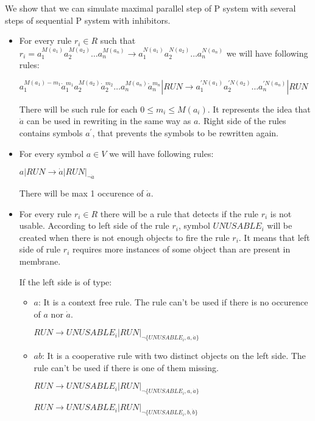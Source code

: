 \documentclass[a4paper,10pt]{article}
\begin{document}
\begin{dokaz}
  We show that we can simulate maximal parallel step of P system with several steps of sequential P system with inhibitors.

  \begin{itemize}
    \item For every rule $r_i\in R$ such that $r_i = a_1^{M(a_1)}a_2^{M(a_2)}\dots a_n^{M(a_n)} \rightarrow a_1^{N(a_1)}a_2^{N(a_2)}\dots a_n^{N(a_n)}$ we will have following rules:
  
    $a_1^{M(a_1)-m_1}\dot{a}_1^{m_1}a_2^{M(a_2)}\dot{a}_2^{m_2}\dots a_n^{M(a_n)}\dot{a}_n^{m_n}|RUN \rightarrow a_1^{\prime N(a_1)}a_2^{\prime N(a_2)}\dots a_n^{\prime N(a_n)}|RUN$

    There will be such rule for each $0\leq m_i\leq M(a_i)$. It represents the idea that $\dot{a}$ can be used in rewriting in the same way as $a$. Right side of the rules contains symbols $a^\prime$, that prevents the symbols to be rewritten again.

    \item For every symbol $a\in V$ we will have following rules:

    $a|RUN \rightarrow \dot{a}|RUN|_{\neg \dot{a}}$

    There will be max 1 occurence of $\dot{a}$.

    \item For every rule $r_i\in R$ there will be a rule that detects if the rule $r_i$ is not usable. According to left side of the rule $r_i$, symbol $UNUSABLE_i$ will be created when there is not enough objects to fire the rule $r_i$. It means that left side of rule $r_i$ requires more instances of some object than are present in membrane.

    If the left side is of type:
    \begin{itemize}
      \item $a$: It is a context free rule. The rule can't be used if there is no occurence of $a$ nor $\dot{a}$.

      $RUN \rightarrow UNUSABLE_i|RUN|_{\neg\{UNUSABLE_i, a, \dot{a}\}}$

      \item $ab$: It is a cooperative rule with two distinct objects on the left side. The rule can't be used if there is one of them missing.

      $RUN \rightarrow UNUSABLE_i|RUN|_{\neg\{UNUSABLE_i, a, \dot{a}\}}$

      $RUN \rightarrow UNUSABLE_i|RUN|_{\neg\{UNUSABLE_i, b, \dot{b}\}}$


\end{itemize}
\end{itemize}
\end{dokaz}
\end{document}

